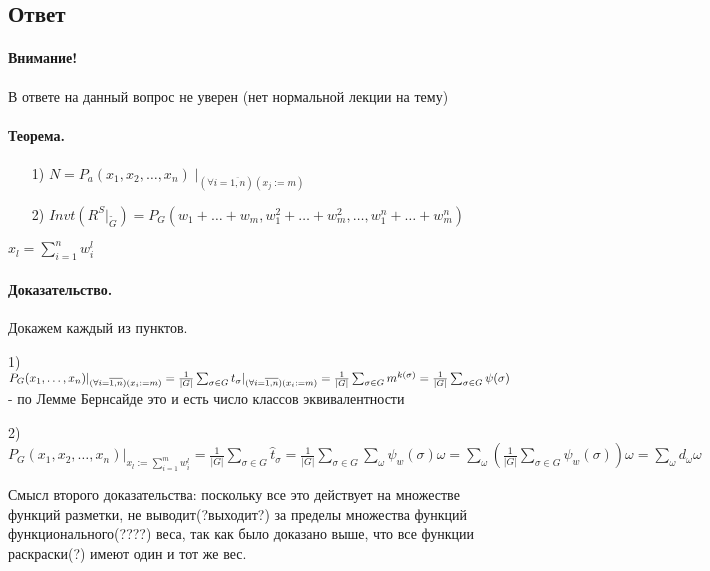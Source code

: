 \documentclass{report}
\begin{document}
\subsection{Ответ}
\paragraph*{Внимание!} В ответе на данный вопрос не уверен (нет нормальной лекции на тему)

\paragraph*{Теорема.}

\begin{itemize}
	\item[1)] $N = P_{a}(x_1,x_2,\ldots,x_{n}) \mid_{(\forall i = \overline{1,n})(x_{j}:=m)}$ 
	\item[2)] $Invt(R^{S} |_{\tilde{G}}) = P_{G}(w_1+\ldots+w_{m}, w_1^2 + \ldots + w_{m}^2,
		\ldots, w_1^{n} + \ldots + w_{m}^{n})$
\end{itemize}

$x_{l} = \sum_{i=1}^{n}w_{i}^{l}$ 


\paragraph*{Доказательство.}
Докажем каждый из пунктов.

1) $P_{G}(x_1,\ldots,x_{n})|_{(\forall i = \overline{1,n})(x_{i}:=m)} = \newline
\frac{1}{|G|}\sum_{\sigma \in G}t_{\sigma}|_{(\forall i = \overline{1,n})(x_{i}:=m)} = \newline
\frac{1}{|G|}\sum_{\sigma \in G}m^{k(\sigma)} =\newline
\frac{1}{|G|}\sum_{\sigma \in G}\psi(\sigma) $ - по Лемме Бернсайде это и есть число классов
эквивалентности

\medskip

2) $P_{G}(x_1,x_2,\ldots,x_{n})|_{x_{l} := \sum_{i=1}^{m}w_{i}^{l} } = 
\frac{1}{|G|}\sum_{\sigma \in G}\hat{t}_{\sigma} = 
\frac{1}{|G|}\sum_{\sigma \in G}\sum_{\omega}\psi_{w}(\sigma)\omega =
\sum_{\omega}( \frac{1}{|G|}\sum_{\sigma \in G}\psi_{w}(\sigma))\omega =
\sum_{\omega}d_{\omega}\omega $

Смысл второго доказательства: поскольку все это действует на множестве функций разметки,
не выводит(?выходит?) за пределы множества функций функционального(????) веса, так как было доказано выше,
что все функции раскраски(?) имеют один и тот же вес.
\end{document}
